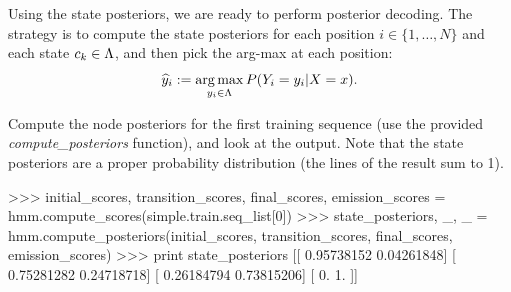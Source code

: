Using the state posteriors, we are ready to perform posterior
decoding. 
The strategy is to compute the state posteriors 
for each position $i \in \{1,\ldots,N\}$
and each state $c_k \in \Lambda$, and 
then pick the arg-max at each position:
\begin{equation}
{\widehat y_i} := \operatorname*{arg\,max}_{y_i \in \Lambda} P(Y_i=y_i| X=x).
\end{equation}





\begin{exercise}

Compute the node posteriors for the first training sequence (use the provided \emph{compute\_posteriors} function), and look at
the output. Note that the state posteriors are a proper
probability distribution (the lines of the result sum to 1).

\begin{python}
>>> initial_scores, transition_scores, final_scores, emission_scores = hmm.compute_scores(simple.train.seq_list[0])
>>> state_posteriors, _, _ = hmm.compute_posteriors(initial_scores,
                                                    transition_scores,
                                                    final_scores,
                                                    emission_scores)
>>> print state_posteriors
[[ 0.95738152  0.04261848]
 [ 0.75281282  0.24718718]
 [ 0.26184794  0.73815206]
 [ 0.          1.        ]]
\end{python}
\end{exercise}

